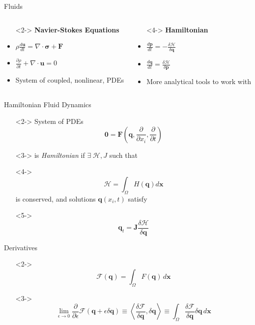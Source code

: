\documentclass{beamer}
\begin{document}
		\begin{frame}[t]{Fluids}
			\begin{columns}
				\begin{column}{0.5\textwidth}
					\begin{itemize}
						\item[]<2-> \textbf{Navier-Stokes Equations}
						\item<3-> $\rho\frac{d \mathbf{u}}{dt} = \nabla\cdot\mathbf{\sigma} + \mathbf{F}$
						\item<3-> $\frac{\partial \rho}{\partial t} + \nabla\cdot\mathbf{u} = 0$
						\item<3-> System of coupled, nonlinear, PDEs
					\end{itemize}
				\end{column}
				\begin{column}{0.5\textwidth}
					\begin{itemize}
						\item[]<4-> \textbf{Hamiltonian}
						\item<5-> $\frac{d \mathbf{p}}{dt} = -\frac{\delta \mathcal{H}}{\delta \mathbf{q}}$
						\item<5-> $\frac{d \mathbf{q}}{dt} = \frac{\delta \mathcal{H}}{\delta \mathbf{p}}$
						\item<5-> More analytical tools to work with
					\end{itemize}
				\end{column}
			\end{columns}
		\end{frame}
		\begin{frame}[t]{Hamiltonian Fluid Dynamics}
			\begin{itemize}
				\item[]<2-> System of PDEs $$\mathbf{0} = \textbf{F}\left(\mathbf{q}, \frac{\partial}{\partial x_i}, \frac{\partial}{\partial t} \right)$$
				\item[]<3-> is \emph{Hamiltonian} if $\exists \; \mathcal{H}, J$ such that
				\item[]<4->$$\mathcal{H} = \int_\Omega H(\mathbf{q}) d\mathbf{x}$$ is conserved, and solutions $\mathbf{q}(x_i, t)$ satisfy
				\item[]<5-> $$\mathbf{q}_t = \mathbf{J}\frac{\delta \mathcal{H}}{\delta \mathbf{q}}$$
			\end{itemize}
		\end{frame}
		\begin{frame}[t]{Derivatives}
			\begin{itemize}
				\item[]<2->$$ \mathcal{F}(\mathbf{q}) = \int_\Omega F(\mathbf{q}) \, d\mathbf{x} $$
				\item[]<3->$$ \lim_{\epsilon \rightarrow 0} \frac{\partial}{\partial \epsilon}\mathcal{F}(\mathbf{q} + \epsilon\delta\mathbf{q}) \equiv \left< \frac{\delta \mathcal{F}}{\delta \mathbf{q}}, \delta\mathbf{q} \right> \equiv \int_\Omega \frac{\delta \mathcal{F}}{\delta \mathbf{q}} \delta\mathbf{q} \, d\mathbf{x} $$
			\end{itemize}
		\end{frame}
\end{document}
